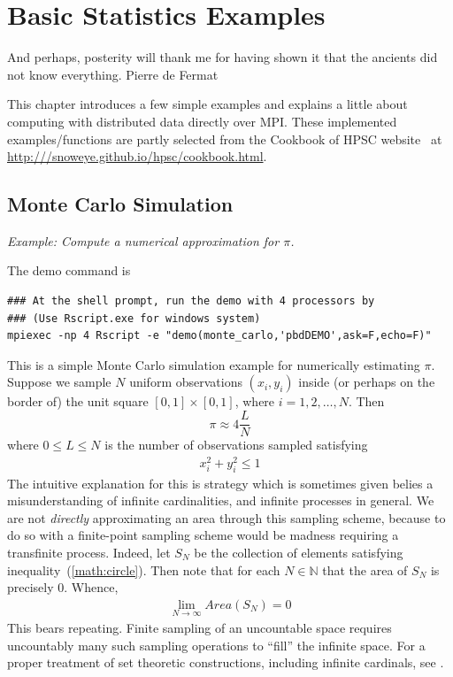 \chapter[Basic Statistics Examples]{Basic Statistics Examples}
\label{sec:statistics_examples}

\inspire%
{And perhaps, posterity will thank me for having shown it that the ancients did not know 
everything.}%
{Pierre de Fermat}
\vspace{0.5cm}


This chapter introduces a few simple examples and explains a little about
computing with distributed data directly over MPI. 
These implemented examples/functions are partly
selected from the Cookbook of HPSC website~\citep{hpsc2011} at
\url{http:///snoweye.github.io/hpsc/cookbook.html}.



\section[Monte Carlo Simulation]{Monte Carlo Simulation}%
\label{sec:monte_carlo}

\emph{Example:  Compute a numerical approximation for $\pi$.}

The demo command is
\begin{lstlisting}
### At the shell prompt, run the demo with 4 processors by
### (Use Rscript.exe for windows system)
mpiexec -np 4 Rscript -e "demo(monte_carlo,'pbdDEMO',ask=F,echo=F)"
\end{lstlisting}

This is a simple Monte Carlo simulation example for numerically estimating
$\pi$.
Suppose we sample $N$ uniform observations $(x_i, y_i)$ inside (or perhaps on
the border of) the unit square $[0, 1]\times [0,1]$,
where $i = 1, 2, \ldots, N$.  Then
\begin{equation}
\pi \approx 4\frac{L}{N}
\label{eqn:pi}
\end{equation}
where $0\leq L\leq N$ is the number of observations sampled satisfying
\begin{align}
x_i^2+y_i^2 \leq 1\label{math:circle}
\end{align}
The intuitive explanation for this is strategy which is sometimes given belies
a misunderstanding of infinite cardinalities, and infinite processes in
general. We are not \emph{directly} approximating an area through this
sampling scheme, because to do so with a finite-point sampling scheme would
be madness requiring a transfinite process. Indeed, let $S_N$ be the
collection of elements satisfying inequality~(\ref{math:circle}).
Then note that for each $N\in\mathbb{N}$ that the area of $S_N$ is
precisely 0. Whence,
\begin{align*}
\lim_{N\rightarrow\infty} Area(S_N) = 0
\end{align*}
This bears repeating. Finite sampling of an uncountable space requires
uncountably many such sampling operations to ``fill'' the infinite space.
For a proper treatment of set theoretic constructions, including infinite
cardinals, see \citep{kunen}.

